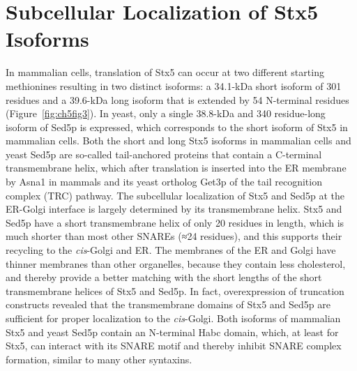 \section{Subcellular Localization of Stx5 Isoforms}

In mammalian cells, translation of Stx5 can occur at two different starting methionines resulting in two distinct isoforms: a 34.1-kDa short isoform of 301 residues and a 39.6-kDa long isoform that is extended by 54 N-terminal residues (Figure~\ref{fig:ch5fig3})\cite{hui_isoform_1997}. In yeast, only a single 38.8-kDa and 340 residue-long isoform of Sed5p is expressed, which corresponds to the short isoform of Stx5 in mammalian cells. Both the short and long Stx5 isoforms in mammalian cells and yeast Sed5p are so-called tail-anchored proteins that contain a C-terminal transmembrane helix, which after translation is inserted into the ER membrane by Asna1 in mammals\cite{norlin_asna1trc40_2016} and its yeast ortholog Get3p\cite{schuldiner_get_2008} of the tail recognition complex (TRC) pathway. The subcellular localization of Stx5 and Sed5p at the ER-Golgi interface is largely determined by its transmembrane helix. Stx5 and Sed5p have a short transmembrane helix of only 20 residues in length, which is much shorter than most other SNAREs (≈24 residues), and this supports their recycling to the \emph{cis}-Golgi and ER\cite{chen_multiple_2016,sharpe_comprehensive_2010}. The membranes of the ER and Golgi have thinner membranes than other organelles, because they contain less cholesterol, and thereby provide a better matching with the short lengths of the short transmembrane helices of Stx5 and Sed5p\cite{sharpe_comprehensive_2010}. In fact, overexpression of truncation constructs revealed that the transmembrane domains of Stx5 and Sed5p are sufficient for proper localization to the \emph{cis}-Golgi\cite{watson_transmembrane_2001,banfield_localization_1994,kasai_roles_2001}. Both isoforms of mammalian Stx5 and yeast Sed5p contain an N-terminal Habc domain, which, at least for Stx5, can interact with its SNARE motif and thereby inhibit SNARE complex formation\cite{xu_subunit_2000}, similar to many other syntaxins\cite{dingjan_endosomal_2018}.

